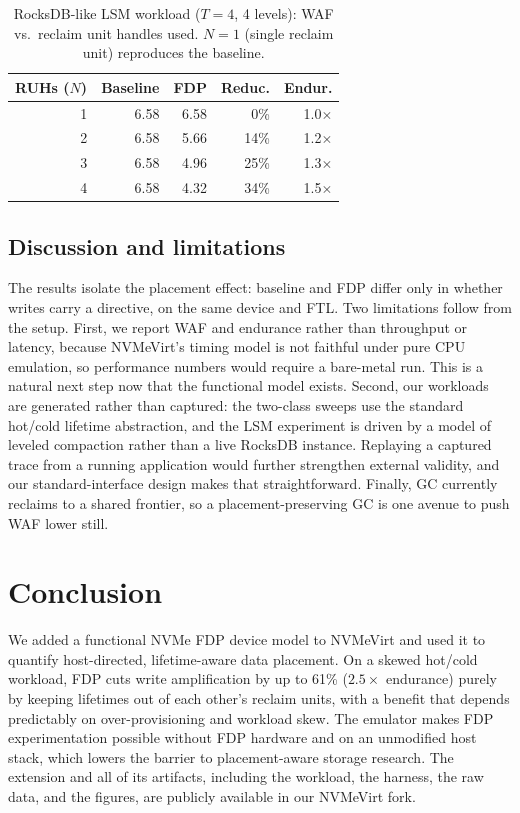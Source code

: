 \documentclass[conference,10pt]{IEEEtran}
\begin{document}
\begin{table}[t]
\centering
\caption{RocksDB-like LSM workload ($T{=}4$, 4 levels): WAF vs.\ reclaim unit
handles used. $N{=}1$ (single reclaim unit) reproduces the baseline.}
\label{tab:lsm}
\footnotesize
\begin{tabular}{rrrrr}
\toprule
RUHs ($N$) & Baseline & FDP & Reduc. & Endur. \\
\midrule
1 & 6.58 & 6.58 & 0\%  & 1.0$\times$ \\
2 & 6.58 & 5.66 & 14\% & 1.2$\times$ \\
3 & 6.58 & 4.96 & 25\% & 1.3$\times$ \\
4 & 6.58 & 4.32 & 34\% & 1.5$\times$ \\
\bottomrule
\end{tabular}
\end{table}

\subsection{Discussion and limitations}
The results isolate the placement effect: baseline and FDP differ only in
whether writes carry a directive, on the same device and FTL. Two limitations
follow from the setup. First, we report WAF and endurance rather than throughput
or latency, because NVMeVirt's timing model is not faithful under pure CPU
emulation, so performance numbers would require a bare-metal run. This is a
natural next step now that the functional model exists. Second, our workloads are
generated rather than captured: the two-class sweeps use the standard hot/cold
lifetime abstraction, and the LSM experiment is driven by a model of leveled
compaction rather than a live RocksDB instance. Replaying a captured trace from a
running application would further strengthen external validity, and our
standard-interface design makes that straightforward. Finally, GC currently
reclaims to a shared frontier, so a placement-preserving GC is one avenue to push
WAF lower still.

\section{Conclusion}
We added a functional NVMe FDP device model to NVMeVirt and used it to quantify
host-directed, lifetime-aware data placement. On a skewed hot/cold workload, FDP
cuts write amplification by up to 61\% ($2.5\times$ endurance) purely by keeping
lifetimes out of each other's reclaim units, with a benefit that depends
predictably on over-provisioning and workload skew. The emulator makes FDP
experimentation possible without FDP hardware and on an unmodified host stack,
which lowers the barrier to placement-aware storage research. The extension and
all of its artifacts, including the workload, the harness, the raw data, and the
figures, are publicly available in our NVMeVirt fork.



\end{document}
